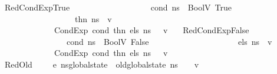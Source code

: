 \begin{isabellebody}
\ \ {\isacharbar}{\kern0pt}\ RedCondExpTrue{\isacharcolon}{\kern0pt}\ \isanewline
\ \ \ \ \ \ \ \ \ \ \ \ \ \ \ {\isachardoublequoteopen}{\isasymlbrakk}\ {\isasymLambda}{\isacharcomma}{\kern0pt}{\isasymGamma}{\isacharcomma}{\kern0pt}{\isasymOmega}\ {\isasymturnstile}\ {\isasymlangle}cond{\isacharcomma}{\kern0pt}\ n{\isacharunderscore}{\kern0pt}s{\isasymrangle}\ {\isasymDown}\ {\isacharparenleft}{\kern0pt}BoolV\ True{\isacharparenright}{\kern0pt}{\isacharsemicolon}{\kern0pt}\ \isanewline
\ \ \ \ \ \ \ \ \ \ \ \ \ \ \ \ \ \ {\isasymLambda}{\isacharcomma}{\kern0pt}{\isasymGamma}{\isacharcomma}{\kern0pt}{\isasymOmega}\ {\isasymturnstile}\ {\isasymlangle}thn{\isacharcomma}{\kern0pt}\ n{\isacharunderscore}{\kern0pt}s{\isasymrangle}\ {\isasymDown}\ v\ {\isasymrbrakk}\ {\isasymLongrightarrow}\isanewline
\ \ \ \ \ \ \ \ \ \ \ \ {\isasymLambda}{\isacharcomma}{\kern0pt}{\isasymGamma}{\isacharcomma}{\kern0pt}{\isasymOmega}\ {\isasymturnstile}\ {\isasymlangle}\ CondExp\ cond\ thn\ els{\isacharcomma}{\kern0pt}\ n{\isacharunderscore}{\kern0pt}s\ {\isasymrangle}\ {\isasymDown}\ v{\isachardoublequoteclose}\isanewline
\ \ {\isacharbar}{\kern0pt}\ RedCondExpFalse{\isacharcolon}{\kern0pt}\ \isanewline
\ \ \ \ \ \ \ \ \ \ \ \ \ \ \ {\isachardoublequoteopen}{\isasymlbrakk}\ {\isasymLambda}{\isacharcomma}{\kern0pt}{\isasymGamma}{\isacharcomma}{\kern0pt}{\isasymOmega}\ {\isasymturnstile}\ {\isasymlangle}cond{\isacharcomma}{\kern0pt}\ n{\isacharunderscore}{\kern0pt}s{\isasymrangle}\ {\isasymDown}\ {\isacharparenleft}{\kern0pt}BoolV\ False{\isacharparenright}{\kern0pt}{\isacharsemicolon}{\kern0pt}\ \isanewline
\ \ \ \ \ \ \ \ \ \ \ \ \ \ \ \ \ \ {\isasymLambda}{\isacharcomma}{\kern0pt}{\isasymGamma}{\isacharcomma}{\kern0pt}{\isasymOmega}\ {\isasymturnstile}\ {\isasymlangle}els{\isacharcomma}{\kern0pt}\ n{\isacharunderscore}{\kern0pt}s{\isasymrangle}\ {\isasymDown}\ v\ {\isasymrbrakk}\ {\isasymLongrightarrow}\isanewline
\ \ \ \ \ \ \ \ \ \ \ \ {\isasymLambda}{\isacharcomma}{\kern0pt}{\isasymGamma}{\isacharcomma}{\kern0pt}{\isasymOmega}\ {\isasymturnstile}\ {\isasymlangle}\ CondExp\ cond\ thn\ els{\isacharcomma}{\kern0pt}\ n{\isacharunderscore}{\kern0pt}s\ {\isasymrangle}\ {\isasymDown}\ v{\isachardoublequoteclose}\isanewline
\ \ {\isacharbar}{\kern0pt}\ RedOld{\isacharcolon}{\kern0pt}\ {\isachardoublequoteopen}{\isasymlbrakk}\ {\isasymLambda}{\isacharcomma}{\kern0pt}{\isasymGamma}{\isacharcomma}{\kern0pt}{\isasymOmega}\ {\isasymturnstile}\ {\isasymlangle}\ e{\isacharcomma}{\kern0pt}\ n{\isacharunderscore}{\kern0pt}s{\isasymlparr}global{\isacharunderscore}{\kern0pt}state\ {\isacharcolon}{\kern0pt}{\isacharequal}{\kern0pt}\ old{\isacharunderscore}{\kern0pt}global{\isacharunderscore}{\kern0pt}state\ n{\isacharunderscore}{\kern0pt}s\ {\isasymrparr}\ {\isasymrangle}\ {\isasymDown}\ v{\isasymrbrakk}\ {\isasymLongrightarrow}\ \isanewline

\end{isabellebody}
